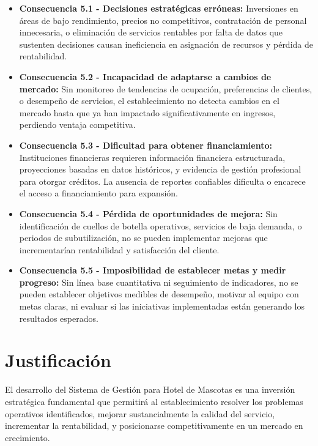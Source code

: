 	\begin{itemize}
		\item \textbf{Consecuencia 5.1 - Decisiones estratégicas erróneas:} Inversiones en áreas de bajo rendimiento, precios no competitivos, contratación de personal innecesaria, o eliminación de servicios rentables por falta de datos que sustenten decisiones causan ineficiencia en asignación de recursos y pérdida de rentabilidad.
		
		\item \textbf{Consecuencia 5.2 - Incapacidad de adaptarse a cambios de mercado:} Sin monitoreo de tendencias de ocupación, preferencias de clientes, o desempeño de servicios, el establecimiento no detecta cambios en el mercado hasta que ya han impactado significativamente en ingresos, perdiendo ventaja competitiva.
		
		\item \textbf{Consecuencia 5.3 - Dificultad para obtener financiamiento:} Instituciones financieras requieren información financiera estructurada, proyecciones basadas en datos históricos, y evidencia de gestión profesional para otorgar créditos. La ausencia de reportes confiables dificulta o encarece el acceso a financiamiento para expansión.
		
		\item \textbf{Consecuencia 5.4 - Pérdida de oportunidades de mejora:} Sin identificación de cuellos de botella operativos, servicios de baja demanda, o periodos de subutilización, no se pueden implementar mejoras que incrementarían rentabilidad y satisfacción del cliente.
		
		\item \textbf{Consecuencia 5.5 - Imposibilidad de establecer metas y medir progreso:} Sin línea base cuantitativa ni seguimiento de indicadores, no se pueden establecer objetivos medibles de desempeño, motivar al equipo con metas claras, ni evaluar si las iniciativas implementadas están generando los resultados esperados.
	\end{itemize}

\section{Justificación}
\label{sec:justificacion}

	El desarrollo del Sistema de Gestión para Hotel de Mascotas es una inversión estratégica fundamental que permitirá al establecimiento resolver los problemas operativos identificados, mejorar sustancialmente la calidad del servicio, incrementar la rentabilidad, y posicionarse competitivamente en un mercado en crecimiento.
	
